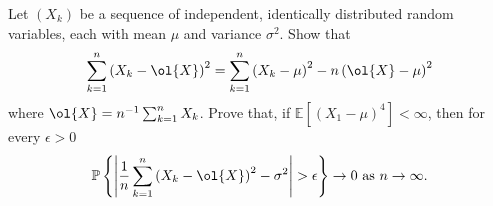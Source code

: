 
\begin{problem}
Let $(X_k)$ be a sequence of independent, identically distributed random variables, each with mean $\mu$ and variance $\sigma^2$. Show that
\begin{equation}
\sum^n_{k=1}\left(X_k-\ol{X}\right)^2=\sum^n_{k=1}\left(X_k-\mu\right)^2 - n\left(\ol{X}-\mu\right)^2
\end{equation}
where $\ol{X}=n^{-1}\sum^n_{k=1}X_k$. Prove that, if $\mathbb{E}\left[(X_1-\mu)^4\right]<\infty$, then for every $\epsilon>0$
\begin{equation}
\mathbb{P}\left\{\left|\frac 1n\sum^n_{k=1}\left(X_k-\ol{X}\right)^2-\sigma^2\right|>\epsilon\right\}\to 0\ \text{as } n\to \infty.
\end{equation}
\end{problem}

